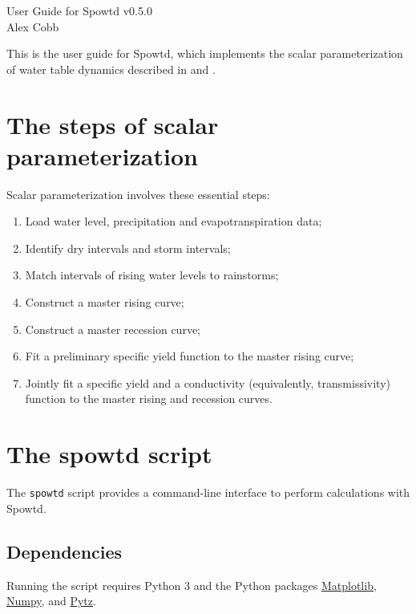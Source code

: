 \documentclass[11pt,a4paper]{article}
\begin{document}
\lstset{language=bash}

{\huge User Guide for Spowtd v0.5.0}\\[2ex]
{\large Alex Cobb}\\[0ex]

\renewcommand{\baselinestretch}{1.18}\normalsize

This is the user guide for Spowtd, which implements the scalar
parameterization of water table dynamics described in
\citet{Cobb_et_al_2017} and \citet{Cobb_and_Harvey_2019}.

\section{The steps of scalar parameterization}
Scalar parameterization involves these essential steps:
\begin{enumerate}
\item Load water level, precipitation and evapotranspiration data;
\item Identify dry intervals and storm intervals;
\item Match intervals of rising water levels to rainstorms;
\item Construct a master rising curve;
\item Construct a master recession curve;
\item Fit a preliminary specific yield function to the master rising
  curve;
\item Jointly fit a specific yield and a conductivity (equivalently,
  transmissivity) function to the master rising and recession curves.
\end{enumerate}

\section{The spowtd script}
The \texttt{spowtd} script provides a command-line interface to
perform calculations with Spowtd.

\subsection{Dependencies}
Running the script requires Python 3 and the Python packages
\href{https://matplotlib.org/}{Matplotlib},
\href{https://numpy.org/}{Numpy}, and
\href{https://pypi.org/project/pytz/}{Pytz}.
\end{document}
